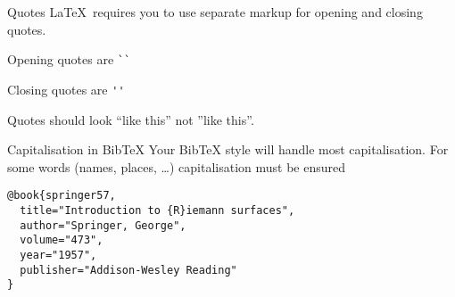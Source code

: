 \begin{frame}[fragile]{Quotes}
  \LaTeX\ requires you to use separate markup for opening and closing quotes. 

  Opening quotes are \lstinline|``|

  Closing quotes are \lstinline|''|

  Quotes should look ``like this'' not ''like this''.
\end{frame}

\begin{frame}[fragile]{Capitalisation in BibTeX}
  Your BibTeX style will handle most capitalisation. For some words (names,
  places, \ldots) capitalisation must be ensured
  \begin{lstlisting}
@book{springer57,
  title="Introduction to {R}iemann surfaces",
  author="Springer, George",
  volume="473",
  year="1957",
  publisher="Addison-Wesley Reading"
}
  \end{lstlisting}
\end{frame}

